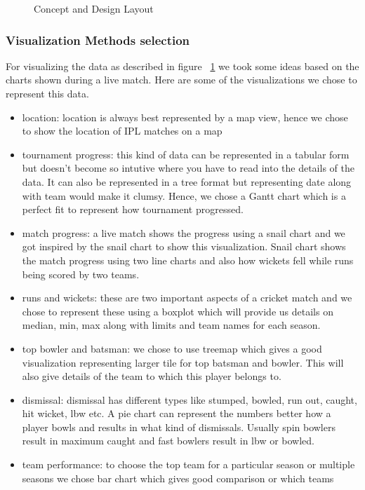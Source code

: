 \documentclass[sigconf]{acmart}
\begin{document}
\begin{figure}[htbp]
\centering
{}
\caption{Concept and Design Layout}
\label{fig:concept}
\end{figure}

\subsubsection{Visualization Methods selection}
For visualizing the data as described in figure ~\ref{fig:concept} we took some ideas
based on the charts shown during a live match. Here are some of the visualizations 
we chose to represent this data.
\begin{itemize}
\item location: location is always best represented by a map view, hence we chose 
to show the location of IPL matches on a map
\item tournament progress: this kind of data can be represented in a tabular form 
but doesn't become so intutive where you have to read into the details of the data.
It can also be represented in a tree format but representing date along with team would
make it clumsy. Hence, we chose a Gantt chart which is a perfect fit to represent 
how tournament progressed.
\item match progress: a live match shows the progress using a snail chart and we
got inspired by the snail chart to show this visualization. Snail chart shows the match 
progress using two line charts and also how wickets fell while runs being scored 
by two teams.
\item runs and wickets: these are two important aspects of a cricket match and we chose
to represent these using a boxplot which will provide us details on median, min, max along
with limits and team names for each season.
\item top bowler and batsman: we chose to use treemap which gives a good visualization
representing larger tile for top batsman and bowler. This will also give details of the team
to which this player belongs to.
\item dismissal: dismissal has different types like stumped, bowled, run out, caught,
hit wicket, lbw etc. A pie chart can represent the numbers better how a player bowls
and results in what kind of dismissals. Usually spin bowlers result in maximum caught
and fast bowlers result in lbw or bowled.
\item team performance: to choose the top team for a particular season or
multiple seasons we chose bar chart which gives good comparison or which teams

\end{itemize}
\end{document}
